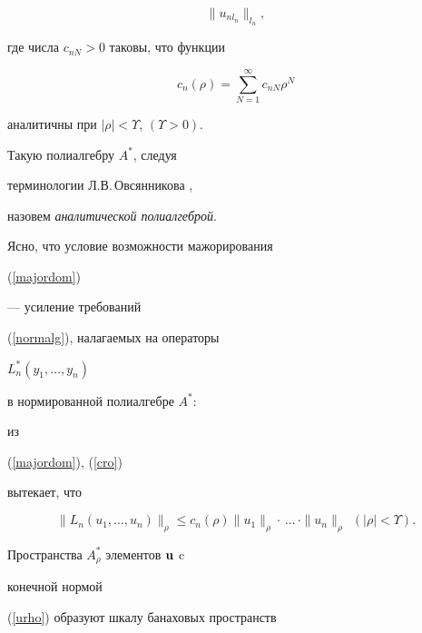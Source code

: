 \begin{defn}
\begin{equation}
\|u_{nl_n}\|_{l_n},


\end{equation}


где числа $c_{nN}>0$ таковы, что функции


\begin{equation}


\label{cro}


c_n(\rho)=\sum_{N=1}^{\infty}c_{nN}\rho^N


\end{equation}


аналитичны при $|\rho|<\Upsilon$, $(\Upsilon>0)$.


Такую полиалгебру $A^*$, следуя


терминологии Л.В.\,Овсянникова \cite{OvsyannikovAnalytic},


назовем {\it аналитической полиалгеброй}.


\end{defn}





Ясно, что условие возможности мажорирования


(\ref{majordom})


--- усиление требований


(\ref{normalg}), налагаемых на операторы


$L_n^*(y_1,\dotsc,y_n)$


в нормированной полиалгебре $A^*$:


из


(\ref{majordom}), (\ref{cro})


вытекает, что


$$




\|L_n(u_1,\dots,u_n)\|_\rho


\leq


c_n(\rho)


\|u_{1}\|_{\rho}\cdot\,


\dotsc\,\cdot


\|u_{n}\|_{\rho} \ \ (|\rho|<\Upsilon).




$$


Пространства $A^*_\rho$ элементов ${\bold{u}}$ c


конечной нормой


(\ref{urho}) образуют шкалу банаховых пространств


